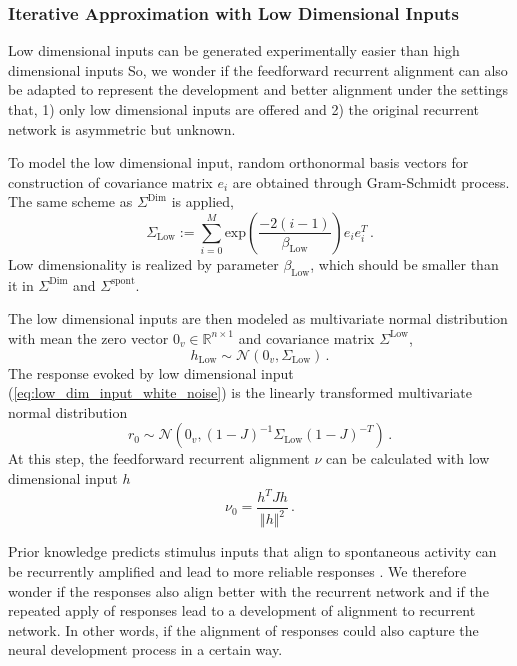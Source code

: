 \documentclass[11pt]{article}
\begin{document}
	\subsubsection{Iterative Approximation with Low Dimensional Inputs} \label{sec:repeat_low_dim_inputs}
	Low dimensional inputs can be generated experimentally easier than high dimensional inputs %
	So, we wonder if the feedforward recurrent alignment can also be adapted to represent the development and better alignment under the settings that, 1) only low dimensional inputs are offered and 2) the original recurrent network is asymmetric but unknown.
	
	To model the low dimensional input, random orthonormal basis vectors for construction of covariance matrix $e_i$ are obtained through Gram-Schmidt process. The same scheme as $\Sigma^{\text{Dim}}$ is applied, 
		\begin{equation}
			\Sigma_{\text{Low}} := \sum_{i=0}^{M} \text{exp}\left(\frac{-2(i-1)}{\beta_{\text{Low}}}\right) e_i e_i^T \, .
		\end{equation}
	Low dimensionality is realized by parameter $\beta_{\text{Low}}$, which should be smaller than it in $\Sigma^{\text{Dim}}$ and $\Sigma^{\text{spont}}$.
	
	The low dimensional inputs are then modeled as multivariate normal distribution with mean the zero vector $0_v \in \mathbb{R}^{n \times 1}$ and covariance matrix $\Sigma^{\text{Low}}$, 
		\begin{equation} \label{eq:low_dim_input_white_noise}
			h_{\text{Low}} \sim \mathcal{N}(0_v, \Sigma_{\text{Low}}) \, .
		\end{equation}
	The response evoked by low dimensional input (\ref{eq:low_dim_input_white_noise}) is the linearly transformed multivariate normal distribution
		\begin{equation}
			r_0 \sim \mathcal{N}\left( 0_v, (1-J)^{-1} \Sigma_{\text{Low}} (1-J)^{-T} \right) \, .
		\end{equation}
	At this step, the feedforward recurrent alignment $\nu$ can be calculated with low dimensional input $h$ 
		\begin{equation} \label{eq:repeat_low_dim_ffrec}
			\nu_0 = \frac{h^T J h}{\Vert h \Vert^2} \,.
		\end{equation} 
	
	Prior knowledge predicts stimulus inputs that align to spontaneous activity can be recurrently amplified and lead to more reliable responses \cite{mulholland2023selective}. 
	We therefore wonder if the responses also align better with the recurrent network and if the repeated apply of responses lead to a development of alignment to recurrent network. In other words, if the alignment of responses could also capture the neural development process in a certain way.
	
\end{document}
